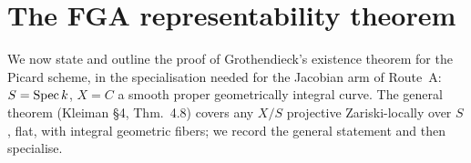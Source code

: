 \section{The FGA representability theorem}
\label{sec:fga_pic_representability}

We now state and outline the proof of Grothendieck's existence theorem
for the Picard scheme, in the specialisation needed for the Jacobian arm
of Route~A: \(S = \operatorname{Spec} k\), \(X = C\) a smooth proper geometrically integral
curve. The general theorem (Kleiman \S 4, Thm.~4.8) covers any
\(X/S\) projective Zariski-locally over \(S\), flat, with integral geometric
fibers; we record the general statement and then specialise.


